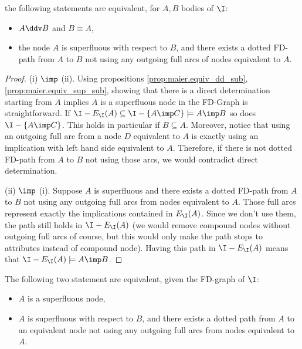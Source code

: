 \begin{proposition} \label{prop:maier.equiv_ssup_dd}
the following statements are equivalent, for $A, B$ bodies of $\I$:
\begin{itemize}
	\item[(i)] $A \ddv B$ and $B \equiv A$,
	\item[(ii)] the node $A$ is superfluous with respect to $B$, and there 
	exists 
	a dotted FD-path from $A$ to $B$ not using any outgoing full arcs of
	nodes equivalent to $A$.
\end{itemize}
	
\end{proposition}


\begin{proof} (i) $\imp$ (ii). Using propositions \ref{prop:maier.equiv_dd_sub},
\ref{prop:maier.equiv_sup_sub}, showing that there is a direct determination 
starting from $A$ implies $A$ is a superfluous node in the FD-Graph is 
straightforward. If $\I - E_{\I}(A) \subseteq \I - \{A \imp C \} \models A \imp 
B$ so does $\I - \{A \imp C \}$. This holds in particular if $B \subseteq A$. 
Moreover, notice that using an outgoing full arc from a node $D$ equivalent to 
$A$ is exactly using an implication with left hand side equivalent to $A$. 
Therefore, if there is not dotted FD-path from $A$ to $B$ not using those arcs, 
we would contradict direct determination.

\vspace{1.2em}

(ii) $\imp$ (i). Suppose $A$ is superfluous and there 
exists a dotted FD-path from $A$ to $B$ not using any outgoing full arcs 
from nodes equivalent to $A$. Those full arcs represent exactly the 
implications contained in $E_{\I}(A)$. Since we don't use them, the path still 
holds in $\I - E_{\I}(A)$ (we would remove compound nodes without outgoing full 
arcs of course, but this would only make the path stops to attributes instead 
of compound node). Having this path in $\I - E_{\I}(A)$ means that $\I - 
E_{\I}(A) \models A \imp B$.
	
\end{proof}

\begin{proposition} \label{prop:maier.equiv_sup_ssup}
	The following two statement are equivalent, given the FD-graph of $\I$:
	\begin{itemize}
		\item[(i)] $A$ is a superfluous node,
		\item[(ii)] $A$ is superfluous with respect to $B$, and there exists a
		dotted path from $A$ to an equivalent node not using any outgoing full 
		arcs from nodes	equivalent to $A$.
	\end{itemize}
	
\end{proposition}

